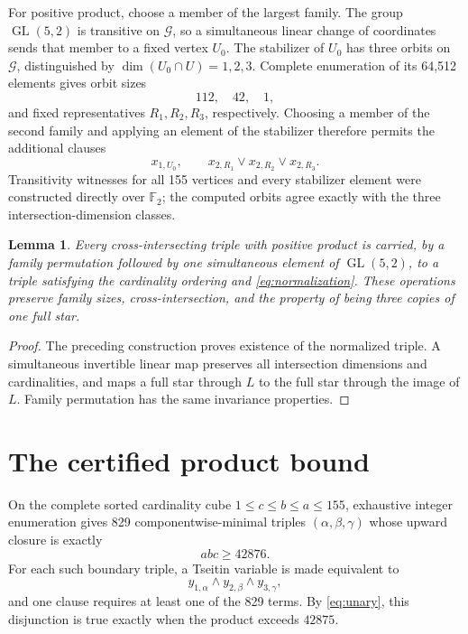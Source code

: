 \documentclass[11pt]{article}
\newtheorem{lemma}[theorem]{Lemma}
\newcommand{\F}{\mathbb F}
\newcommand{\cG}{\mathcal G}
\begin{document}
For positive product, choose a member of the largest family.  The group
$\operatorname{GL}(5,2)$ is transitive on $\cG$, so a simultaneous linear
change of coordinates sends that member to a fixed vertex $U_0$.  The
stabilizer of $U_0$ has three orbits on $\cG$, distinguished by
$\dim(U_0\cap U)=1,2,3$.  Complete enumeration of its 64,512 elements gives
orbit sizes
\[
 112,\quad 42,\quad 1,
\]
and fixed representatives $R_1,R_2,R_3$, respectively.  Choosing a member of
the second family and applying an element of the stabilizer therefore permits
the additional clauses
\begin{equation}\label{eq:normalization}
 x_{1,U_0},\qquad
 x_{2,R_1}\vee x_{2,R_2}\vee x_{2,R_3}.
\end{equation}
Transitivity witnesses for all 155 vertices and every stabilizer element were
constructed directly over $\F_2$; the computed orbits agree exactly with the
three intersection-dimension classes.

\begin{lemma}\label{lem:normalization}
Every cross-intersecting triple with positive product is carried, by a family
permutation followed by one simultaneous element of $\operatorname{GL}(5,2)$,
to a triple satisfying the cardinality ordering and
\eqref{eq:normalization}.  These operations preserve family sizes,
cross-intersection, and the property of being three copies of one full star.
\end{lemma}

\begin{proof}
The preceding construction proves existence of the normalized triple.  A
simultaneous invertible linear map preserves all intersection dimensions and
cardinalities, and maps a full star through $L$ to the full star through the
image of $L$.  Family permutation has the same invariance properties.
\end{proof}

\section{The certified product bound}

On the complete sorted cardinality cube
$1\leq c\leq b\leq a\leq155$, exhaustive integer enumeration gives 829
componentwise-minimal triples $(\alpha,\beta,\gamma)$ whose upward closure is
exactly
\[
  abc\geq42876.
\]
For each such boundary triple, a Tseitin variable is made equivalent to
\[
 y_{1,\alpha}\wedge y_{2,\beta}\wedge y_{3,\gamma},
\]
and one clause requires at least one of the 829 terms.  By
\eqref{eq:unary}, this disjunction is true exactly when the product exceeds
$42875$.
\end{document}
